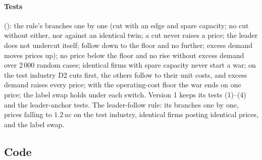 \paragraph{Tests} (): the rule's branches one by one (cut with an
edge and spare capacity; no cut without either, nor against an identical twin; a cut never
raises a price; the leader does not undercut itself; follow down to the floor and no further;
excess demand moves prices up); no price below the floor and no rise without excess demand
over 2\,000 random cases; identical firms with spare capacity never start a war; on the test
industry D2 cuts first, the others follow to their unit costs, and excess demand raises every
price; with the operating-cost floor the war ends on one price; the label swap holds under each
switch. Version 1 keeps its tests (1)--(4) and the leader-anchor tests. The leader-follow
rule: its branches one by one, prices falling to $1.2\,uc$ on the test industry, identical
firms posting identical prices, and the label swap.

\subsection*{Code}
